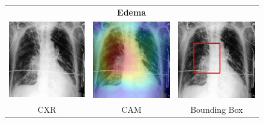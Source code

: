 \begin{figure}[htbp!]
\centering
\begin{tabular}{ccc}
 &\textbf{Edema}& \\
\vspace{2mm}
  \includegraphics[width=35mm]{Tesi/images/CAMs/CAM10/image.png} &   
  \includegraphics[width=35mm]{Tesi/images/CAMs/CAM10/image_cam.png} &   
  \includegraphics[width=35mm]{Tesi/images/CAMs/CAM10/image_bbox.png} \\
\footnotesize{CXR} & \footnotesize{CAM} & \footnotesize{Bounding Box} \\[6pt]
\end{tabular}
\caption[Edema CAM-1]{}
\label{fig:figure_5.24}
\end{figure}



